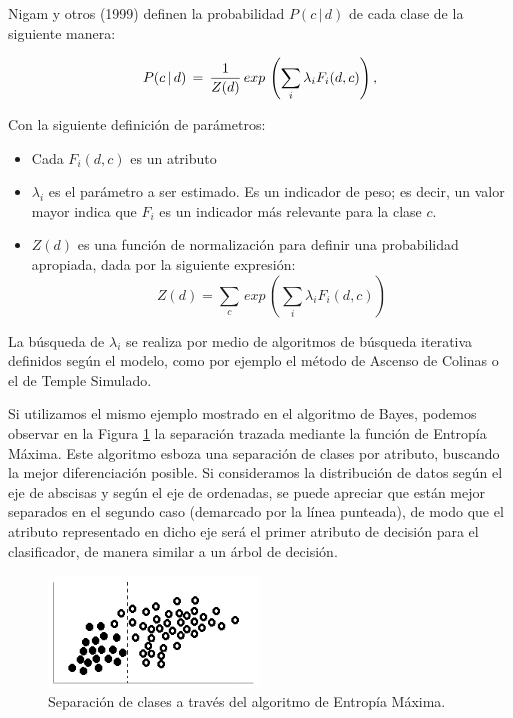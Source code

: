 {Nigam y otros (1999) definen la probabilidad $P(c \, | \, d)$ de cada clase de la siguiente manera:
\newline

$$ P(c \, | \, d) \, = \, {1 \over Z(d)} \, exp \, 
\left(
\sum_{i} \lambda_{i}F_{i}(d,c)
\right) ,$$

Con la siguiente definici\'on de par\'ametros:

\begin{itemize}
\item Cada $F_{i}(d,c)$ es un atributo
\item $\lambda_{i}$ es el par\'ametro a ser estimado. Es un indicador de peso; es decir, un valor mayor indica que $F_{i}$ es un indicador m\'as relevante para la clase $c$.
\item $Z(d)$ es una funci\'on de normalizaci\'on para definir una probabilidad apropiada, dada por la siguiente expresi\'on:
$$
Z(d) = \sum_{c} \, exp \, \left( \sum_{i} \lambda_{i}F_{i}(d,c)  \right)
$$
\end{itemize}

La b\'usqueda de $\lambda_{i}$ se realiza por medio de algoritmos de b\'usqueda iterativa definidos seg\'un el modelo, como por ejemplo el m\'etodo de Ascenso de Colinas o el de Temple Simulado.
\newline

Si utilizamos el mismo ejemplo mostrado en el algoritmo de Bayes, podemos observar en la Figura \ref{entropy} la separaci\'on trazada mediante la funci\'on de Entrop\'ia M\'axima. Este algoritmo esboza una separaci\'on de clases por atributo, buscando la mejor diferenciaci\'on posible. Si consideramos la distribuci\'on de datos seg\'un el eje de abscisas y seg\'un el eje de ordenadas, se puede apreciar que est\'an mejor separados en el segundo caso (demarcado por la l\'inea punteada), de modo que el atributo representado en dicho eje ser\'a el primer atributo de decisi\'on para el clasificador, de manera similar a un \'arbol de decisi\'on.
\newline

\begin{figure}[h]
\centering
\includegraphics[width=0.5\textwidth]{entropy.png}
\caption{Separaci\'on de clases a trav\'es del algoritmo de Entrop\'ia M\'axima.}
\label{entropy}
\end{figure}

}
